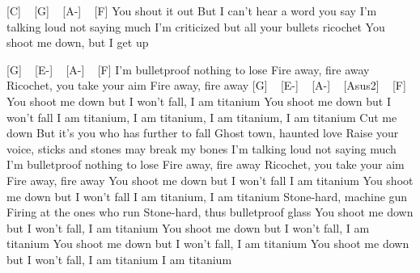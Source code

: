 [C] ~ [G] ~ [A-] ~ [F]
You shout it out
But I can't hear a word you say
I'm talking loud not saying much
I'm criticized but all your bullets ricochet
You shoot me down, but I get up

[G] ~ [E-] ~ [A-] ~ [F]
I'm bulletproof nothing to lose
Fire away, fire away
Ricochet, you take your aim
Fire away, fire away
[G] ~ [E-] ~ [A-] ~ [Asus2] ~ [F]
You shoot me down but I won't fall, I am titanium
You shoot me down but I won't fall
I am titanium, I am titanium, I am titanium, I am titanium
Cut me down
But it's you who has further to fall
Ghost town, haunted love
Raise your voice, sticks and stones may break my bones
I'm talking loud not saying much
I'm bulletproof nothing to lose
Fire away, fire away
Ricochet, you take your aim
Fire away, fire away
You shoot me down but I won't fall
I am titanium
You shoot me down but I won't fall
I am titanium, I am titanium
Stone-hard, machine gun
Firing at the ones who run
Stone-hard, thus bulletproof glass
You shoot me down but I won't fall, I am titanium
You shoot me down but I won't fall, I am titanium
You shoot me down but I won't fall, I am titanium
You shoot me down but I won't fall, I am titanium
I am titanium